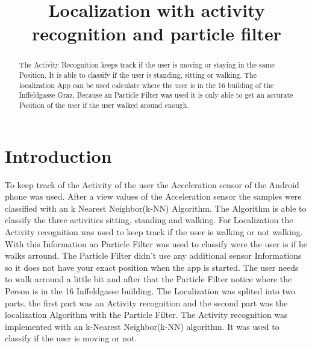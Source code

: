 \documentclass[conference]{IEEEtran}
\begin{document}
\title{Localization with activity recognition and particle filter\\}

\author{
\and
{}
}

\maketitle

\begin{abstract}
The Activity Recognition keeps track if the user is moving or staying in the same Position. It is able to classify if the user is standing, sitting or walking. The localization App can be used calculate where the user is in the 16 building of the Inffeldgasse Graz. Because an Particle Filter was used it is only able to get an accurate Position of the user if the user walked around enough.
\end{abstract}

\section{Introduction}
To keep track of the Activity of the user the Acceleration sensor of the Android phone was used. After a view values of the Acceleration sensor the samples were classified with an k Nearest Neighbor(k-NN) Algorithm. The Algorithm is able to classify the three activities sitting, standing and walking. For Localization the Activity recognition was used to keep track if the user is walking or not walking. With this Information an Particle Filter was used to classify were the user is if he walks arround. The Particle Filter didn't use any additional sensor Informations so it does not have your exact   position when the app is started. The user needs to walk arround a little bit and after that the Particle Filter notice where the Person is in the 16 Inffeldgasse building.
The Localization was splited into two parts, the first part was an Activity recognition and the second part was the localization Algorithm with the Particle Filter. The Activity recognition was implemented with an k-Nearest Neighbor(k-NN) algorithm. It was used to classify if the user is moving or not. 
\end{document}
